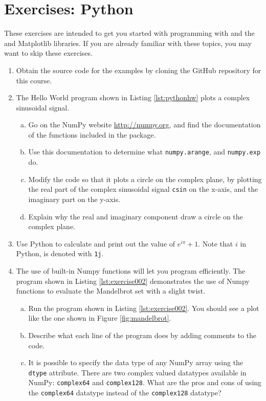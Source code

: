 \newpage
\section{Exercises: Python}

These exercises are intended to get you started with programming with
\emph{} and the \emph{} and
Matplotlib libraries. If you are already familiar with these topics,
you may want to skip these exercises.

\begin{enumerate}
 \item Obtain the source code for the examples by cloning the GitHub
   repository for this course. 
\item The Hello World program shown in Listing \ref{lst:pythonhw} plots a complex sinusoidal signal. 
  \begin{enumerate}[a)]
  \item Go on the NumPy website \url{http://numpy.org}, and find the documentation of the functions included in the package.
  \item Use this documentation to determine what \verb|numpy.arange|, and \verb|numpy.exp| do. 
  \item Modify the code so that it plots a circle on the complex
    plane, by plotting the real part of the complex sinusoidal
    signal \verb|csin| on the x-axis, and the imaginary part on the
    y-axis.
  \item Explain why the real and imaginary component draw a circle on the complex plane.
  \end{enumerate}

\item Use Python to calculate and print out the value of $e^{i \pi} + 1$. Note that $i$ in Python, is denoted
  with \verb|1j|.
  
\item The use of built-in Numpy functions will let you program
  efficiently. The program shown in Listing \ref{lst:exercise002}
  demonstrates the use of Numpy functions to evaluate the Mandelbrot
  set with a slight twist.



\begin{enumerate}[a)]
  \item Run the program shown in Listing \ref{lst:exercise002}. You
    	should see a plot like the one shown in Figure \ref{fig:mandelbrot}.
  \item Describe what each line of the program does by adding comments to the code.
  \item It is possible to specify the data type of any NumPy array
      	using the \verb|dtype| attribute. There are two complex valued
      	datatypes available in NumPy: \verb|complex64| and \verb|complex128|. 
      	What are the pros and cons of using the \verb|complex64| datatype 
      	instead of the \verb|complex128| datatype? 
\end{enumerate}



\end{enumerate}
